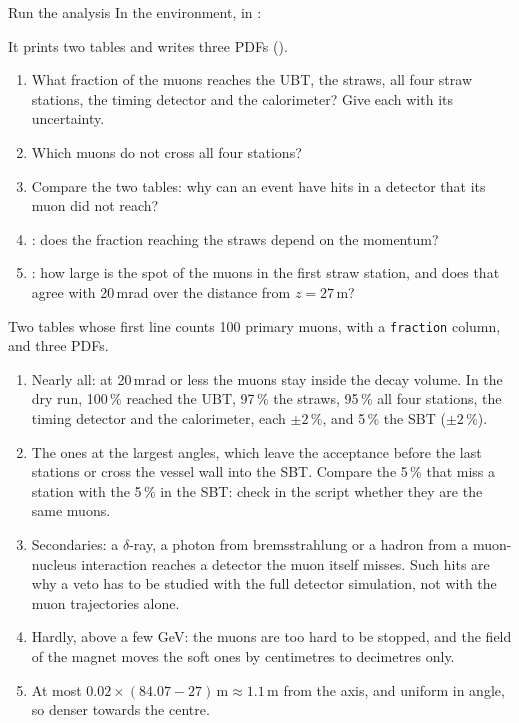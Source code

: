 \begin{exercise}{Run the analysis}
\label{ex:muonbackground}
In the  environment, in :
It prints two tables and writes three PDFs ().
\begin{enumerate}
  \item What fraction of the muons reaches the UBT, the straws, all four
        straw stations, the timing detector and the calorimeter? Give each
        with its uncertainty.
  \item Which muons do not cross all four stations?
  \item Compare the two tables: why can an event have hits in a detector
        that its muon did not reach?
  \item {}: does the fraction reaching the straws depend on the
        momentum?
  \item {}: how large is the spot of the muons in
        the first straw station, and does that agree with 20\,mrad over the
        distance from $z=27$\,m?
\end{enumerate}
\end{exercise}

\begin{checkpoint}
Two tables whose first line counts 100 primary muons, with a
\texttt{fraction} column, and three PDFs.
\end{checkpoint}

\begin{solution}
\begin{enumerate}
  \item Nearly all: at 20\,mrad or less the muons stay inside the decay
        volume. In the dry run, 100\,\% reached the UBT, 97\,\% the straws,
        95\,\% all four stations, the timing detector and the calorimeter,
        each $\,\%$, and 5\,\% the SBT ($\,\%$).
  \item The ones at the largest angles, which leave the acceptance before the
        last stations or cross the vessel wall into the SBT. Compare
        the 5\,\% that miss a station with the 5\,\% in the SBT: check in the
        script whether they are the same muons.
  \item Secondaries: a $\delta$-ray, a photon from bremsstrahlung or a hadron
        from a muon-nucleus interaction reaches a detector the muon itself
        misses. Such hits are why a veto has to be studied with the full
        detector simulation, not with the muon trajectories alone.
  \item Hardly, above a few GeV: the muons are too hard to be stopped, and
        the field of the magnet moves the soft ones by centimetres to
        decimetres only.
  \item At most $0.02\times(84.07-27)\,$\,m from the
        axis, and uniform in angle, so denser towards the centre.
\end{enumerate}
\end{solution}

